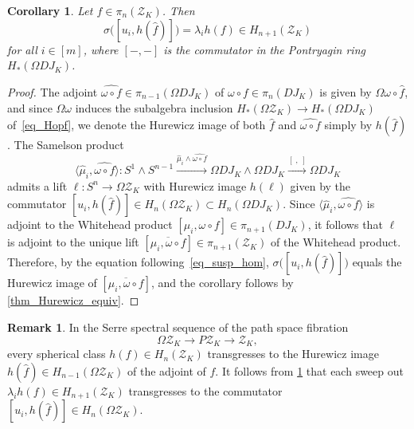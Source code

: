 \documentclass[a4paper,10pt]{amsart}
\newtheorem{corollary}[theorem]{Corollary}
\theoremstyle{definition}
\newtheorem{remark}[theorem]{Remark}
\theoremstyle{remark}
\begin{document}
\begin{corollary}\label{cor_equiv}
Let $f\in\pi_n(\mathcal{Z}_K)$. Then
\[ \sigma\big( [u_i,h(\hat{f})] \big) = \lambda_ih(f) \in H_{n+1}(\mathcal{Z}_K) \]
for all $i\in [m]$, where $[-,-]$ is the commutator in the Pontryagin ring $H_*(\Omega DJ_K)$.
\end{corollary}

\begin{proof}
The adjoint $\widehat{\omega\circ f} \in\pi_{n-1}(\Omega DJ_K)$ of $\omega\circ f \in \pi_n(DJ_K)$ is given by $\Omega\omega\circ\hat{f}$, and since $\Omega\omega$ induces the subalgebra inclusion $H_*(\Omega\mathcal{Z}_K) \to H_*(\Omega DJ_K)$ of~\eqref{eq_Hopf}, we denote the Hurewicz image of both $\hat{f}$ and $\widehat{\omega\circ f}$ simply by $h(\hat{f})$. The Samelson product
\[
\langle \hat{\mu}_i,\widehat{\omega\circ f} \rangle \colon S^1\wedge S^{n-1} \xrightarrow{\hat{\mu}_i\wedge\widehat{\omega\circ f}} \Omega DJ_K\wedge\Omega DJ_K \xrightarrow{[\;,\;]} \Omega DJ_K
\]
admits a lift $\ell\colon S^n \to \Omega\mathcal{Z}_K$ with Hurewicz image $h(\ell)$ given by the commutator $[u_i,h(\hat{f})] \in H_n(\Omega\mathcal{Z}_K)\subset H_n(\Omega DJ_K)$. Since $\langle \hat{\mu}_i,\widehat{\omega\circ f} \rangle$ is adjoint to the Whitehead product $[\mu_i,\omega\circ f] \in \pi_{n+1}(DJ_K)$, it follows that $\ell$ is adjoint to the unique lift $[\overline{\mu_i,\omega\circ f}] \in \pi_{n+1}(\mathcal{Z}_K)$ of the Whitehead product. Therefore, by the equation following~\eqref{eq_susp_hom}, $\sigma\big( [u_i,h(\hat{f})] \big)$ equals the Hurewicz image of $[\overline{\mu_i,\omega\circ f}]$, and the corollary follows by \cref{thm_Hurewicz_equiv}.
\end{proof}

\begin{remark}
In the Serre spectral sequence of the path space fibration 
\[ \Omega\mathcal{Z}_K \longrightarrow P\mathcal{Z}_K \longrightarrow \mathcal{Z}_K, \] 
every spherical class $h(f)\in H_n(\mathcal{Z}_K)$ transgresses to the Hurewicz image $h(\hat{f}) \in H_{n-1}(\Omega\mathcal{Z}_K)$ of the adjoint of $f$. It follows from \cref{cor_equiv} that each sweep out $\lambda_ih(f) \in H_{n+1}(\mathcal{Z}_K)$ transgresses to the commutator $[u_i,h(\hat{f})] \in H_n(\Omega\mathcal{Z}_K)$. 
\end{remark}
\end{document}
